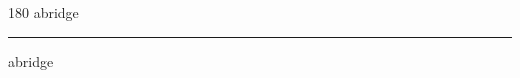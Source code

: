 
\begin{frame}
\begin{center}
\begin{turn}{180}
{\fontsize{2.5cm}{1em}\selectfont abridge}
\end{turn}
\vspace{1em}\par  
\hrule
\vspace{1em}\par  
{\fontsize{2.5cm}{1em}\selectfont abridge}
\end{center}
\end{frame}
